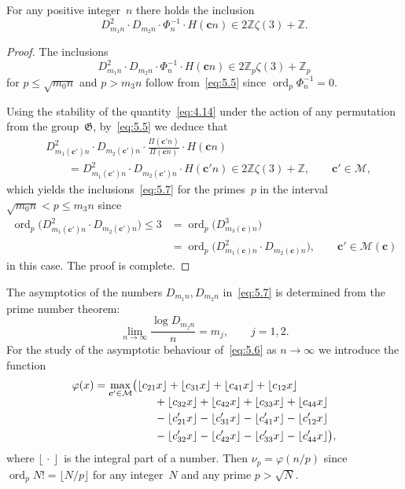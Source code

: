 \documentclass[a4paper,twoside]{article}
\numberwithin{equation}{section}
\renewcommand{\[}{\lfloor}
\renewcommand{\]}{\rfloor}
\newcommand{\<}{\langle}
\renewcommand{\>}{\rangle}
\renewcommand{\phi}{\varphi}
\DeclareMathOperator{\ord}{ord}
\newcommand{\bc}{\boldsymbol c}
\newcommand{\fG}{\mathfrak G}
\newcommand{\sM}{\mathcal M}
\begin{document}
\begin{lemma}
\label{lem:10}
For any positive integer~$n$ there holds the inclusion
$$
D_{m_1n}^2\cdot D_{m_2n}
\cdot\Phi_n^{-1}\cdot H(\bc n)
\in2\mathbb Z\zeta(3)+\mathbb Z.
$$
\end{lemma}

\begin{proof}
The inclusions
\begin{equation}
D_{m_1n}^2\cdot D_{m_2n}
\cdot\Phi_n^{-1}\cdot H(\bc n)
\in2\mathbb Z_p\zeta(3)+\mathbb Z_p
\label{eq:5.7}
\end{equation}
for $p\le\sqrt{m_0n}$ and $p>m_3n$ follow from~\eqref{eq:5.5}
since $\ord_p\Phi_n^{-1}=0$.

Using the stability of the quantity~\eqref{eq:4.14}
under the action of any permutation from the group~$\fG$,
by~\eqref{eq:5.5} we deduce that
\begin{align*}
&
D_{m_1(\bc')n}^2\cdot D_{m_2(\bc')n}
\cdot\frac{\varPi(\bc'n)}{\varPi(\bc n)}\cdot H(\bc n)
\\ &\qquad
=D_{m_1(\bc')n}^2\cdot D_{m_2(\bc')n}\cdot H(\bc'n)
\in2\mathbb Z\zeta(3)+\mathbb Z,
\qquad \bc'\in\sM,
\end{align*}
which yields the inclusions~\eqref{eq:5.7} for the primes~$p$
in the interval $\sqrt{m_0n}<p\le m_3n$ since
\begin{align*}
\ord_p\bigl(D_{m_1(\bc')n}^2\cdot D_{m_2(\bc')n}\bigr)
\le3
&=\ord_p\bigl(D_{m_3(\bc)n}^3\bigr)
\\
&=\ord_p\bigl(D_{m_1(\bc)n}^2\cdot D_{m_2(\bc)n}\bigr),
\qquad \bc'\in\sM(\bc)
\end{align*}
in this case. The proof is complete.
\end{proof}

The asymptotics of the numbers $D_{m_1n},D_{m_2n}$ in~\eqref{eq:5.7}
is determined from the prime number theorem:
$$
\lim_{n\to\infty}\frac{\log D_{m_jn}}n=m_j,
\qquad j=1,2.
$$
For the study of the asymptotic behaviour of~\eqref{eq:5.6}
as $n\to\infty$ we introduce the function
\begin{align*}
\phi(x)=\smash{\max_{\bc'\in\sM}}&\bigl(
\[c_{21}x\]+\[c_{31}x\]+\[c_{41}x\]+\[c_{12}x\]
\\ &\qquad
+\[c_{32}x\]+\[c_{42}x\]+\[c_{33}x\]+\[c_{44}x\]
\\ &\qquad
-\[c_{21}'x\]-\[c_{31}'x\]-\[c_{41}'x\]-\[c_{12}'x\]
\\ &\qquad
-\[c_{32}'x\]-\[c_{42}'x\]-\[c_{33}'x\]-\[c_{44}'x\]\bigr),
\end{align*}
where $\[\,\cdot\,\]$~is the integral part of a number.
Then $\nu_p=\phi(n/p)$ since
$\ord_pN!=\[N/p\]$ for any
integer~$N$ and any prime $p>\sqrt N$.
\end{document}
